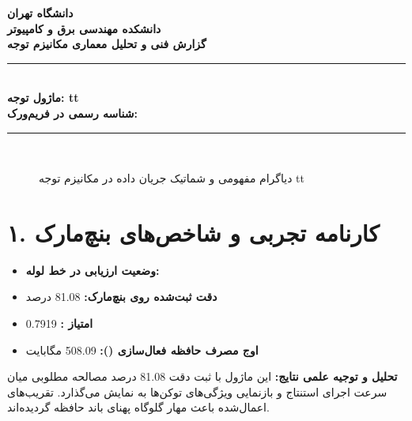 \documentclass[12pt,a4paper]{article}
\begin{document}
\begin{center}
{\Large\bfseries دانشگاه تهران}\\[0.2cm]
{\large\bfseries دانشکده مهندسی برق و کامپیوتر}\\[0.2cm]
{\large\bfseries گزارش فنی و تحلیل معماری مکانیزم توجه}\\[0.5cm]
\rule{\linewidth}{1pt}\\[0.3cm]
{\LARGE\bfseries ماژول توجه: tt}\\[0.2cm]
{\large \textbf{شناسه رسمی در فریم‌ورک:} }\\[0.2cm]
\rule{\linewidth}{1pt}\\[0.5cm]
\end{center}

\begin{figure}[H]
\centering
{}
\caption{دیاگرام مفهومی و شماتیک جریان داده در مکانیزم توجه tt}
\end{figure}

\section*{۱. کارنامه تجربی و شاخص‌های بنچ‌مارک}
\begin{itemize}
\item \textbf{وضعیت ارزیابی در خط لوله:} 
\item \textbf{دقت ثبت‌شده روی بنچ‌مارک:} 81.08 درصد
\item \textbf{امتیاز :} 0.7919
\item \textbf{اوج مصرف حافظه فعال‌سازی ():} 508.09 مگابایت
\end{itemize}
\textbf{تحلیل و توجیه علمی نتایج:} این ماژول با ثبت دقت 81.08 درصد مصالحه مطلوبی میان سرعت اجرای استنتاج و بازنمایی ویژگی‌های توکن‌ها به نمایش می‌گذارد. تقریب‌های اعمال‌شده باعث مهار گلوگاه پهنای باند حافظه گردیده‌اند.
\end{document}
